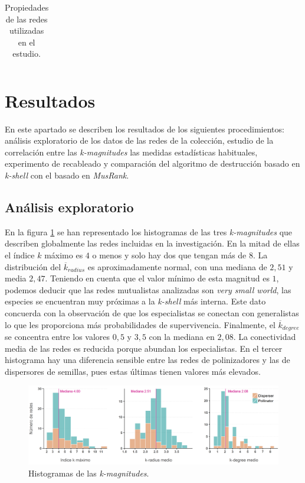 \begin{table}[htbp]
\begin{tabular}{lrrrrrrrrr}
    \bottomrule
    \end{tabular}%
    \caption{\label{table:table_results} Propiedades de las redes utilizadas en el estudio.}

\end{table}%

\section{Resultados}

En este apartado se describen los resultados de los siguientes procedimientos: análisis exploratorio de los datos de las redes de la colección, estudio de la correlación entre las \textit{k-magnitudes} las medidas estadísticas habituales, experimento de recableado y comparación del algoritmo de destrucción basado en \textit{k-shell} con el basado en \textit{MusRank}.

\subsection{Análisis exploratorio}

En la figura \ref{fig:ESTATICA_hist_kmagnitudes} se han representado los histogramas de las tres \textit{k-magnitudes} que describen globalmente las redes incluidas en la investigación. En la mitad de ellas el índice $k$ máximo es $4$ o menos y solo hay dos que tengan más de $8$. La distribución del $\overline{k}_{radius}$ es aproximadamente normal, con una mediana de $2,51$ y media $2,47$. Teniendo en cuenta que el valor mínimo de esta magnitud es $1$, podemos deducir que las redes mutualistas analizadas son \textit{very small world}, las especies se encuentran muy próximas a la \textit{k-shell} más interna. Este dato concuerda con la observación de que los especialistas se conectan con generalistas lo que les proporciona más probabilidades de supervivencia. Finalmente, el $\overline{k}_{degree}$ se
concentra entre los valores $0,5$ y $3,5$ con la mediana en $2,08$. La conectividad media de las redes es reducida
porque abundan los especialistas. En el tercer histograma hay una diferencia sensible entre las redes de polinizadores
y las de dispersores de semillas, pues estas últimas tienen valores más elevados.

\begin{figure}[h!]
\centering
\includegraphics[scale=0.5]{Figures/ESTATICA_hist_kmagnitudes.png}
\caption{Histogramas de las \textit{k-magnitudes}.}
\label{fig:ESTATICA_hist_kmagnitudes}
\end{figure}

